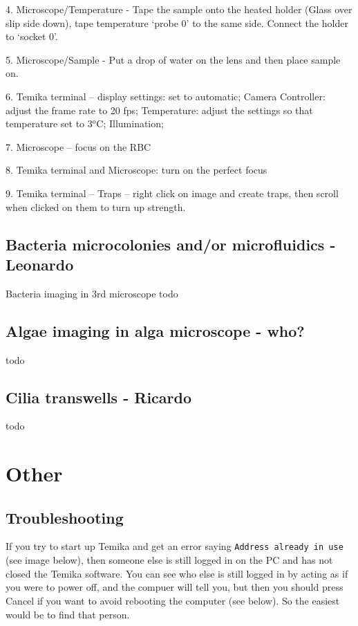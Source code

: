 \documentclass{report}
\begin{document}
4.    Microscope/Temperature - Tape the sample onto the heated holder (Glass over slip side down), tape temperature `probe 0' to the same side. Connect the holder to `socket 0'.


5.    Microscope/Sample - Put a drop of water on the lens and then place sample on.



6.    Temika terminal –     display settings: set to automatic;    Camera Controller: adjust the frame rate to 20 fps;     Temperature: adjust the settings so that temperature set to 3$^o$C;
Illumination;

7.    Microscope – focus on the RBC

8.    Temika terminal and  Microscope: turn on the perfect focus

9.    Temika terminal – Traps – right click on image and create traps, then scroll when clicked on them to turn up strength.


\section{Bacteria microcolonies and/or microfluidics  - Leonardo}
Bacteria imaging in 3rd microscope todo

\section{Algae imaging in alga microscope  - who?}
todo

\section{Cilia transwells  - Ricardo}
todo





\chapter{Other}

\section{Troubleshooting}
If you try to start up Temika and get an error saying \verb|Address already in use| (see image below), then someone else is still logged in on the PC and has not closed the Temika software. You can see who else is still logged in by acting as if you were to power off, and the compuer will tell you, but then you should press Cancel if you want to avoid rebooting the computer (see below). So the easiest would be to find that person.
\end{document}
